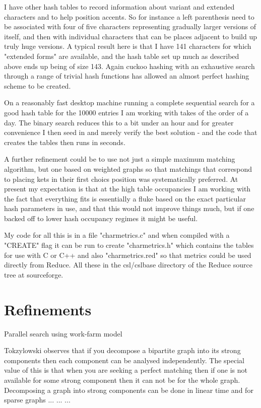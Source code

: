 \documentclass [a4paper,11pt]{article}
\begin{document}
I have other hash tables to record information about variant and extended 
characters and to help position accents. So for instance a left 
parenthesis need to be associated with four of five characters 
representing gradually larger versions of itself, and then with individual 
characters that can be places adjacent to build up truly huge versions. 
A typical result here is that I have 141 characters for which "extended 
forms" are available, and the hash table set up much as described above 
ends up being of size 143. Again cuckoo hashing with an exhaustive search 
through a range of trivial hash functions has allowed an almost perfect 
hashing scheme to be created.

On a reasonably fast desktop machine running a complete sequential search 
for a good hash table for the 10000 entries I am working with takes of the 
order of a day. The binary search reduces this to a bit under an hour and 
for greater convenience I then seed in and merely verify the best solution 
- and the code that creates the tables then runs in seconds.

A further refinement could be to use not just a simple maximum matching 
algorithm, but one based on weighted graphs so that matchings that 
correspond to placing kets in their first choics position was 
systematically preferred. At present my expectation is that at the high 
table occupancies I am working with the fact that everything fits is 
essentially a fluke based on the exact particular hash parameters in use, 
and that this would not improve things much, but if one backed off to 
lower hash occupancy regimes it might be useful.

My code for all this is in a file "charmetrics.c" and when compiled with a 
"CREATE" flag it can be run to create "charmetrics.h" which contains the 
tables for use with C or C++ and also "charmetrics.red" so that metrics 
could be used directly from Reduce. All these in the csl/cslbase directory 
of the Reduce source tree at sourceforge.

\section{Refinements}

Parallel search using work-farm model


Tokzylowski observes\cite{tokzlyowski} that if you decompose a bipartite
graph into its strong components then each component can be analysed
independently. The special value of this is that when you are seeking a
perfect matching then if one is not available for some strong component then
it can not be for the whole graph. Decomposing a graph into strong components
can be done in linear time and for sparse graphs ... ... ...
 
\end{document}

